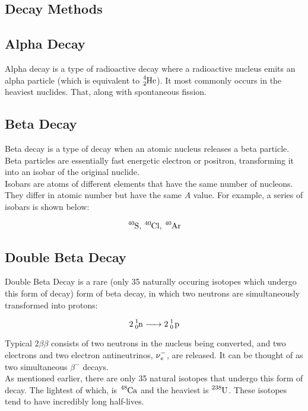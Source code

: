 \documentclass{article}
\begin{document}
\begin{multicols*}{2}
    \section{Decay Methods}
    \subsection{Alpha Decay}
    Alpha decay is a type of radioactive decay where a radioactive nucleus
    emits an alpha particle (which is equivalent to $\ce{^4_2He}$). It most
    commonly occurs in the heaviest nuclides. That, along with spontaneous
    fission.

    \subsection{Beta Decay}
    Beta decay is a type of decay when an atomic nucleus releases a beta
    particle. Beta particles are essentially fast energetic electron or
    positron, transforming it into an isobar of the original nuclide.\\

    Isobars are atoms of different elements that have the same number of
    nucleons. They differ in atomic number but have the same $A$ value.
    For example, a series of isobars is shown below:

    \[
      \ce{^{40}S}\text{, }\ce{^{40}Cl}\text{, }\ce{^{40}Ar}
    \]

    \subsection{Double Beta Decay}
    Double Beta Decay is a rare (only 35 naturally occuring isotopes which
    undergo this form of decay) form of beta decay, in which two neutrons
    are simultaneously transformed into protons:

    \[
      \ce{2 ^{1}_{0}n -> 2 ^{1}_{0} p}
    \]

    Typical $2\beta\beta$ consists of two neutrons in the nucleus being converted,
    and two electrons and two electron antineutrinos, $\ce{\nu^{-}_{e}}$,
    are released. It can be thought of as two simultaneous $\beta^{-}$ decays.\\

    As mentioned earlier, there are only 35 natural isotopes that undergo
    this form of decay. The lightest of which, is $\ce{^{48}Ca}$ and the heaviest
    is $\ce{^{238}U}$. These isotopes tend to have incredibly long half-lives.\\


\end{multicols*}
\end{document}
